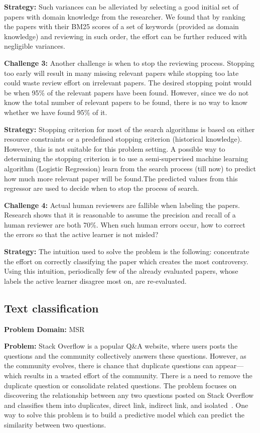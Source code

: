 \documentclass[table, xcdraw, sigconf,review, anonymous]{acmart}
\begin{document}
\noindent\textbf{Strategy: }
Such variances can be alleviated by selecting a good initial set of papers with domain knowledge from the researcher. We found that by ranking the papers with their BM25 scores of a set of keywords (provided as domain knowledge) and reviewing in such order, the effort can be further reduced with negligible variances.
   
\vspace{1.0ex}
\noindent\textbf{Challenge 3: }
Another challenge is when to stop the reviewing process. Stopping too early will result in many missing relevant papers while stopping too late could waste review effort on irrelevant papers. The desired stopping point would be when 95\% of the relevant papers have been found. However, since we do not know the total number of relevant papers to be found, there is no way to know whether we have found 95\% of it.

\noindent\textbf{Strategy: }
Stopping criterion for most of the search algorithms is based on either resource constraints or a predefined stopping criterion (historical knowledge). However, this is not suitable for this problem setting. A possible way to determining the stopping criterion is to use a semi-supervised machine learning algorithm (Logistic Regression) learn from the search process (till now) to predict how much more relevant paper will be found.The predicted values from this regressor are used to decide when to stop the process of search.
   
\vspace{1.0ex}
\noindent\textbf{Challenge 4: }
Actual human reviewers are fallible when labeling the papers. Research shows that it is reasonable to assume the precision and recall of a human reviewer are both 70\%. When such human errors occur, how to correct the errors so that the active learner is not misled?

\noindent\textbf{Strategy: }
The intuition used to solve the problem is the following: concentrate the effort on correctly classifying the paper which creates the most controversy. Using this intuition, periodically few of the already evaluated papers, whose labels the active learner disagree most on, are re-evaluated.

\subsection{Text classification}
\noindent\textbf{Problem Domain: } MSR

\noindent\textbf{Problem: } Stack Overflow is a popular Q\&A website, where users posts the questions and the community collectively answers these questions. However, as the community evolves, there is chance that duplicate questions can appear---which results in a wasted effort of the community. There is a need to remove the duplicate question or consolidate related questions. The problem focuses on discovering the relationship between any two questions posted on Stack Overflow and classifies them into duplicates, direct link, indirect link, and isolated~\cite{fu2017easy, xu2016predicting}. One way to solve this problem is to build a predictive model which can predict the similarity between two questions. 
\end{document}
